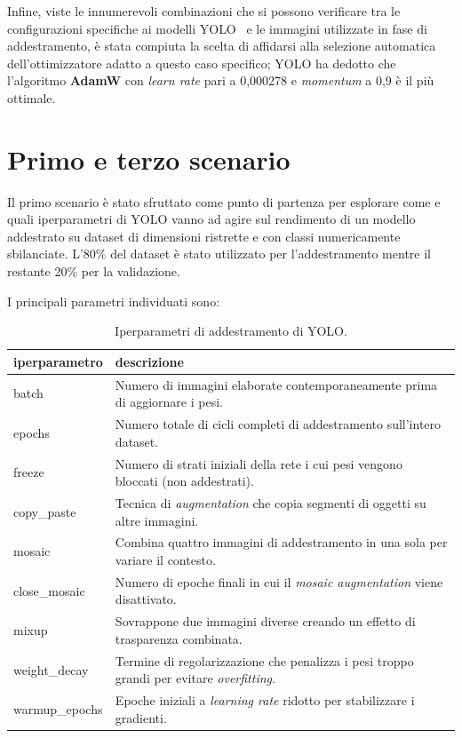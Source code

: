 \documentclass[../main.tex]{subfiles}
\begin{document}
\vspace{\baselineskip}
\noindent
Infine, viste le innumerevoli combinazioni che si possono verificare tra le configurazioni specifiche ai modelli YOLO~\cite{ultralytics_inc} e le immagini utilizzate in fase di addestramento, è stata compiuta la scelta di affidarsi alla selezione automatica dell'ottimizzatore adatto a questo caso specifico; YOLO ha dedotto che l'algoritmo \textbf{AdamW} con \textit{learn rate} pari a 0,000278 e \textit{momentum} a 0,9 è il più ottimale.

\clearpage

\section{Primo e terzo scenario}
Il primo scenario è stato sfruttato come punto di partenza per esplorare come e quali \gls{iperparametri} di YOLO vanno ad agire sul rendimento di un modello addestrato su dataset di dimensioni ristrette e con classi numericamente sbilanciate. L'80\% del dataset è stato utilizzato per l'addestramento mentre il restante 20\% per la validazione.

\vspace{\baselineskip}
\noindent
I principali parametri individuati sono:
\begin{table}[h!]
    \centering
    \caption{Iperparametri di addestramento di YOLO.}
    \label{tab:yolo_parameters}
    \begin{tabular}{|l|p{10cm}|}
        \hline
        \textbf{iperparametro} & \textbf{descrizione} \\ \hline
        batch & Numero di immagini elaborate contemporaneamente prima di aggiornare i pesi. \\ \hline
        epochs & Numero totale di cicli completi di addestramento sull'intero dataset. \\ \hline
        freeze & Numero di strati iniziali della rete i cui pesi vengono bloccati (non addestrati). \\ \hline
        copy\_paste & Tecnica di \textit{augmentation} che copia segmenti di oggetti su altre immagini. \\ \hline
        mosaic & Combina quattro immagini di addestramento in una sola per variare il contesto. \\ \hline
        close\_mosaic & Numero di epoche finali in cui il \textit{mosaic augmentation} viene disattivato. \\ \hline
        mixup & Sovrappone due immagini diverse creando un effetto di trasparenza combinata. \\ \hline
        weight\_decay & Termine di regolarizzazione che penalizza i pesi troppo grandi per evitare \textit{overfitting}. \\ \hline
        warmup\_epochs & Epoche iniziali a \textit{learning rate} ridotto per stabilizzare i gradienti. \\ \hline
    \end{tabular}
\end{table}
\end{document}
